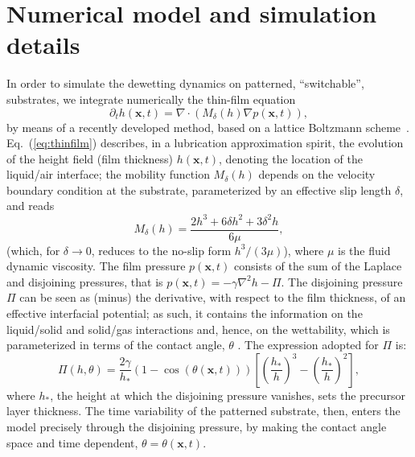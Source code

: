 \documentclass[twocolumn,amsmath,amssymb,showpacs,pre,nofootinbib,superscriptaddress]{revtex4-1} %
\begin{document}
\section{Numerical model and simulation details}\label{sec:method}
In order to simulate the dewetting dynamics on patterned, ``switchable'', substrates, we integrate numerically the thin-film equation~\cite{ReynoldsLubr,RevModPhys.69.931,RevModPhys.81.1131} 
\begin{equation}\label{eq:thinfilm}
    \partial_t h(\mathbf{x},t) = \nabla\cdot\left(M_{\delta}(h)\nabla p(\mathbf{x},t)\right),
\end{equation}
by means of a recently developed method, based on a lattice Boltzmann
scheme~\cite{PhysRevE.100.033313,PhysRevE.104.034801}.
Eq.~(\ref{eq:thinfilm}) describes, in a lubrication approximation spirit, the evolution of the height field (film thickness) $h(\mathbf{x},t)$, denoting the location of the liquid/air interface;
the mobility function $M_{\delta}(h)$ depends on the velocity boundary condition at the substrate, parameterized by an effective slip length $\delta$, and reads
\begin{equation}\label{eq:mobility}
  M_{\delta}(h) = \frac{2h^3 + 6\delta h^2 + 3\delta^2h}{6\mu},
\end{equation}  
(which, for $\delta \rightarrow 0$, reduces to the no-slip form $h^3/(3\mu)$),
where $\mu$ is the fluid dynamic viscosity.
The film pressure $p(\mathbf{x},t)$ consists of the sum of the Laplace and disjoining pressures, that is $p(\mathbf{x},t) = -\gamma \nabla^2 h - \Pi$. The disjoining pressure
$\Pi$ can be seen as (minus) the derivative, with respect to the film thickness, of an effective interfacial potential; as such, it contains the information on the
liquid/solid and solid/gas interactions and, hence, on the wettability, which is parameterized in terms of the contact angle, $\theta$ \cite{RevModPhys.81.739, SCHWARTZ1998173}. 
The expression adopted for $\Pi$ is:
\begin{equation}\label{eq:disjoinpressure}
  \Pi(h,\theta) = \frac{2\gamma}{h_{\ast}}(1-\cos(\theta(\mathbf{x},t)))\left[\left(\frac{h_{\ast}}{h}\right)^3 - \left(\frac{h_{\ast}}{h}\right)^2\right],
\end{equation}
where $h_{\ast}$, the height at which the disjoining pressure vanishes, sets the precursor layer thickness.
The time variability of the patterned substrate, then, enters the model precisely through the
disjoining pressure, by making the contact angle space and time dependent, $\theta = \theta(\mathbf{x},t)$.
\end{document}
